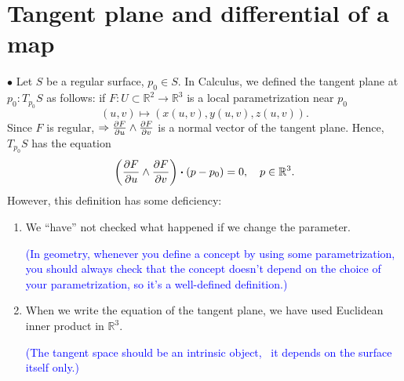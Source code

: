 \section{Tangent plane and differential of a map}
$\bullet$ Let $S$ be a regular surface, \(p_0\in S\). In Calculus, we
defined the tangent plane at \(p_0\colon T_{p_0}S\) as follows: if
\(F\colon U\subset \mathbb{R}^2\to \mathbb{R}^3\) is a local parametrization near \(p_0\)
\[
    (u,v)\mapsto \left(x(u,v),y(u,v),z(u,v)\right).
\]
Since \(F\) is regular, \(\Rightarrow \pdv{F}{u}\wedge\pdv
{F}{v}\) is a normal vector of the tangent plane. Hence,
\(T_{p_0}S\) has the equation
\[
    \left(\pdv{F}{u}\wedge\pdv{F}{v}\right)\vdot
    (p-p_0)=0,\quad p\in \mathbb{R}^3  .
\]
However, this definition has some deficiency:
\begin{enumerate}[(1)]
    \item We ``have'' not checked what happened if we change the parameter.

          \textcolor{blue}{(In geometry, whenever you define a concept by using
              some parametrization, you should always check that the concept doesn't
              depend on the choice of your parametrization, so it's a well-defined
              definition.)}
    \item When we write the equation of the tangent plane, we have used
          Euclidean inner product in $\mathbb{R}^3$.

          \textcolor{blue}{(The tangent space should be an intrinsic object, \ie\ it depends on the surface itself only.)}
\end{enumerate}
